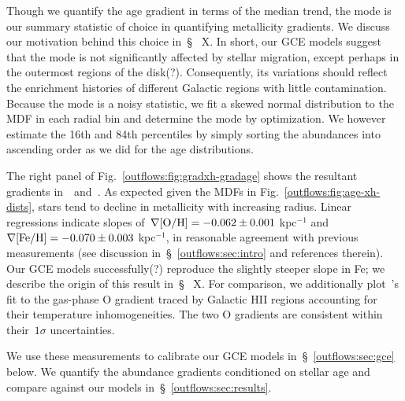 Though we quantify the age gradient in terms of the median trend, the mode is
our summary statistic of choice in quantifying metallicity gradients.
We discuss our motivation behind this choice in~\S~{\color{red} X}.
In short, our GCE models suggest that the mode is not significantly affected
by stellar migration, {\color{red} except perhaps in the outermost regions of
the disk(?).}
Consequently, its variations should reflect the enrichment histories of
different Galactic regions with little contamination.
Because the mode is a noisy statistic, we fit a skewed normal distribution to
the MDF in each radial bin and determine the mode by optimization.
We however estimate the 16th and 84th percentiles by simply sorting the
abundances into ascending order as we did for the age distributions.
\par
The right panel of Fig.~\ref{outflows:fig:gradxh-gradage} shows the resultant
gradients in~\oh~and~\feh.
As expected given the MDFs in Fig.~\ref{outflows:fig:age-xh-dists}, stars tend
to decline in metallicity with increasing radius.
Linear regressions indicate slopes of~$\nabla\text{[O/H]} = -0.062 \pm 0.001$ kpc$^{-1}$
and~$\nabla\text{[Fe/H]} = -0.070 \pm 0.003$ kpc$^{-1}$, in reasonable agreement with
previous measurements (see discussion in~\S~\ref{outflows:sec:intro} and
references therein).
Our GCE models {\color{red} successfully(?)} reproduce the slightly steeper
slope in Fe; we describe the origin of this result in~\S~{\color{red} X}.
For comparison, we additionally plot~\citeauthor{MendezDelgado2022}'s
\citeyearpar{MendezDelgado2022} fit to the gas-phase O gradient traced by
Galactic HII regions accounting for their temperature inhomogeneities.
The two O gradients are consistent within their~$1\sigma$ uncertainties.
\par
We use these measurements to calibrate our GCE models
in~\S~\ref{outflows:sec:gce} below.
We quantify the abundance gradients conditioned on stellar age and compare
against our models in~\S~\ref{outflows:sec:results}.

